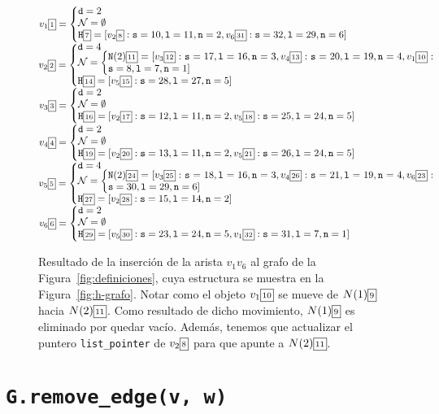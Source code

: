 \documentclass[%
    a4paper,%
    fontsize=12pt,%
    DIV=12,
    twoside,%
    openright,%
    titlepage=true,%
    headsepline,%
    toc=bibliography,%
    parskip=half,%
    cleardoublepage=empty,%
    headings=big,%
]{scrbook}
\makeatletter
\newcommand{\Code}[2][]{\lstinline[basicstyle={\ttfamily},#1]@#2@}
\makeatother
\begin{document}
\begin{figure}[ht]
\parindent=0pt\small
$\VV{1}{1}{\mathtt{d}=2\\
           \NNNEmpty\\
           \NH{7}{\neigh{v_2}{8}{10}{11}{2}, \neigh{v_6}{31}{32}{29}{6}}}$\\[2mm]
$\VV{2}{2}{\mathtt{d}=4\\
           \NNN{\NN{2}{11}{\neigh{v_3}{12}{17}{16}{3}, \neigh{v_4}{13}{20}{19}{4}, \neigh{v_1}{10}{8}{7}{1}}}\\
           \NH{14}{\neigh{v_5}{15}{28}{27}{5}}}$\\[2mm]
$\VV{3}{3}{\mathtt{d}=2\\
           \NNNEmpty \\
           \NH{16}{\neigh{v_2}{17}{12}{11}{2}, \neigh{v_5}{18}{25}{24}{5}}}$\\[2mm]
$\VV{4}{4}{\mathtt{d}=2\\
           \NNNEmpty \\
           \NH{19}{\neigh{v_2}{20}{13}{11}{2}, \neigh{v_5}{21}{26}{24}{5}}}$\\[2mm]
$\VV{5}{5}{\mathtt{d}=4\\
           \NNN{\NN{2}{24}{\neigh{v_3}{25}{18}{16}{3}, \neigh{v_4}{26}{21}{19}{4}, \neigh{v_6}{23}{30}{29}{6}}}\\
                \NH{27}{\neigh{v_2}{28}{15}{14}{2}}}$\\[2mm]
$\VV{6}{6}{\mathtt{d}=2\\
           \NNNEmpty \\
           \NH{29}{\neigh{v_5}{30}{23}{24}{5}, \neigh{v_1}{32}{31}{7}{1}}}$%
%

\caption{Resultado de la inserción de la arista $v_1v_6$ al grafo de la Figura~\ref{fig:definiciones}, cuya estructura se muestra en la Figura~\ref{fig:h-grafo}.  Notar como el objeto $v_1\fbox{\!\scriptsize10\!}$ se mueve de $N(1)\fbox{\!\scriptsize9\!}$ hacia $N(2)\fbox{\!\scriptsize11\!}$.  Como resultado de dicho movimiento, $N(1)\fbox{\!\scriptsize9\!}$ es eliminado por quedar vacío. Además, tenemos que actualizar el puntero \Code{list_pointer} de $v_2\fbox{\!\scriptsize8\!}$ para que apunte a $N(2)\fbox{\!\scriptsize11\!}$.
} \label{fig:insert_edge_después}
\end{figure}

\section{\texorpdfstring{\Code{G.remove_edge(v, w)}}{G.remove\_edge(v, w)}}
\label{sec:hgraph:remove_edge}
\end{document}
